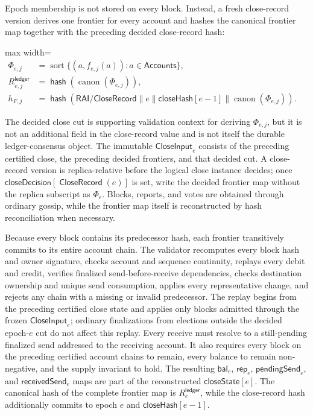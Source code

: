 \documentclass[sigplan,twocolumn,review,anonymous]{acmart}
\newcommand{\func}[1]{\operatorname{\mathsf{#1}}}
\newcommand{\hash}{\func{hash}}
\newcommand{\CloseRecord}{\func{CloseRecord}}
\newcommand{\closeDecision}{\mathsf{closeDecision}}
\newcommand{\closeHash}{\mathsf{closeHash}}
\newcommand{\closeState}{\mathsf{closeState}}
\newcommand{\bal}{\mathsf{bal}}
\newcommand{\repOf}{\mathsf{rep}}
\newcommand{\pendingSend}{\mathsf{pendingSend}}
\newcommand{\receivedSend}{\mathsf{receivedSend}}
\begin{document}
Epoch membership is not stored on every block.  Instead, a fresh close-record version derives one
frontier for every account and hashes the canonical frontier map together with the preceding decided
close-record hash:
\begin{center}
\begin{adjustbox}{max width=\columnwidth}
\(\displaystyle
\begin{aligned}
\Phi_{e,j}
    &=\operatorname{sort}\{(a,f_{e,j}(a)):a\in\mathsf{Accounts}\},\\
R^{\mathsf{ledger}}_{e,j}
    &=\hash(\operatorname{canon}(\Phi_{e,j})),\\
h_{F,j}
    &=\hash(\mathsf{RAI/CloseRecord}\parallel e\parallel\closeHash[e-1]
       \parallel\operatorname{canon}(\Phi_{e,j})).
\end{aligned}
\)
\end{adjustbox}
\end{center}
The decided close cut is supporting validation context for deriving \(\Phi_{e,j}\), but it is not an
additional field in the close-record value and is not itself the durable ledger-consensus object.  The
immutable \(\mathsf{CloseInput}_e\) consists of the preceding certified close, the preceding decided
frontiers, and that decided cut.  A close-record version is replica-relative before the logical close
instance decides; once \(\closeDecision[\CloseRecord(e)]\) is set, write the decided frontier map
without the replica subscript as \(\Phi_e\).  Blocks, reports, and votes are obtained through ordinary
gossip, while the frontier map itself is reconstructed by hash reconciliation when necessary.

Because every block contains its predecessor hash, each frontier transitively commits to its entire
account chain.  The validator recomputes every block hash and owner signature, checks account and
sequence continuity, replays every debit and credit, verifies finalized send-before-receive dependencies,
checks destination ownership and unique send consumption, applies every representative change, and
rejects any chain with a missing or invalid predecessor.  The replay begins from the preceding certified
close state and applies only blocks admitted through the frozen \(\mathsf{CloseInput}_e\); ordinary
finalizations from elections outside the decided epoch-\(e\) cut do not affect this replay.  Every receive
must resolve to a still-pending finalized send addressed to the receiving account.  It also requires
every block on the preceding certified account chains to remain, every balance to remain non-negative,
and the supply invariant to hold.
The resulting \(\bal_e\), \(\repOf_e\), \(\pendingSend_e\), and \(\receivedSend_e\) maps are part of
the reconstructed \(\closeState[e]\).  The canonical hash of the complete frontier map is
\(R^{\mathsf{ledger}}_e\), while the close-record hash additionally commits to epoch \(e\) and
\(\closeHash[e-1]\).
\end{document}
